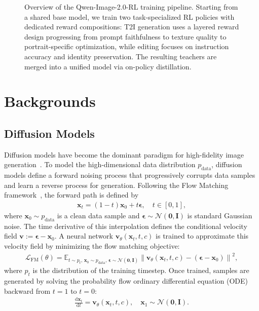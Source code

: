 \documentclass{article} %
\renewcommand{\mathbf}[1]{\bm{#1}}
\begin{document}
\begin{figure}[t]
{%
}
\caption{Overview of the Qwen-Image-2.0-RL training pipeline. Starting from a shared base model, we train two task-specialized RL policies with dedicated reward compositions: T2I generation uses a layered reward design progressing from prompt faithfulness to texture quality to portrait-specific optimization, while editing focuses on instruction accuracy and identity preservation. The resulting teachers are merged into a unified model via on-policy distillation.}
\label{fig:pipeline}
\end{figure}


\section{Backgrounds}

\subsection{Diffusion Models}
Diffusion models have become the dominant paradigm for high-fidelity image generation~\citep{sohl2015deep,ho2020denoising,song2021score,liu2022flow,lipman2022flow}. To model the high-dimensional data distribution $p_{\text{data}}$, diffusion models define a forward noising process that progressively corrupts data samples and learn a reverse process for generation. Following the Flow Matching framework~\citep{lipman2022flow,liu2022flow}, the forward path is defined by
\begin{align}
    \mathbf{x}_t=(1-t)\mathbf{x}_0+t\mathbf{\epsilon}, \quad t\in [0,1],
\end{align}
where $\mathbf{x}_0\sim p_{\text{data}}$ is a clean data sample and $\mathbf{\epsilon}\sim\mathcal{N}(\mathbf{0}, \mathbf{I})$ is standard Gaussian noise. The time derivative of this interpolation defines the conditional velocity field $ \mathbf{v} := \mathbf{\epsilon} - \mathbf{x}_0$.
A neural network $\mathbf{v}_\theta(\mathbf{x}_t, t,c)$ is trained to approximate this velocity field by minimizing the flow matching objective:
\begin{align}
    \mathcal{L}_{\text{FM}}(\theta) = \mathbb{E}_{t\sim p_t,\,\mathbf{x}_0\sim p_{\text{data}},\,\mathbf{\epsilon}\sim\mathcal{N}(\mathbf{0},\mathbf{I})} \left\| \mathbf{v}_\theta(\mathbf{x}_t, t,c) - (\mathbf{\epsilon} - \mathbf{x}_0) \right\|^2,
    \label{eq:fm_loss}
\end{align}
where $p_t$ is the distribution of the training timestep.
Once trained, samples are generated by solving the probability flow ordinary differential equation (ODE) backward from $t=1$ to $t=0$:
\begin{align}
    \frac{\mathrm{d}\mathbf{x}_t}{\mathrm{d}t} = \mathbf{v}_\theta(\mathbf{x}_t, t,c), \quad \mathbf{x}_1 \sim \mathcal{N}(\mathbf{0}, \mathbf{I}).
    \label{eq:sampling-ode}
\end{align}
\end{document}
